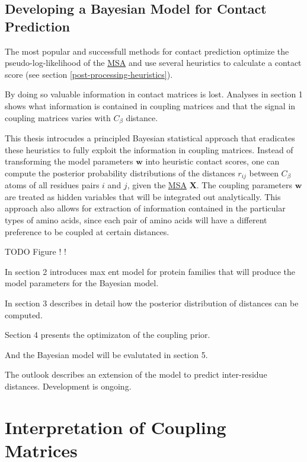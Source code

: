 \documentclass[12pt,a4paper,twoside]{book}
\newcommand{\Cb}{C_\beta}
\newcommand{\w}{\mathbf{w}}
\newcommand{\X}{\mathbf{X}}
\theoremstyle{definition}
\theoremstyle{definition}
\theoremstyle{remark}
\begin{document}
\section{Developing a Bayesian Model for Contact
Prediction}\label{developing-a-bayesian-model-for-contact-prediction}

The most popular and successfull methods for contact prediction optimize
the pseudo-log-likelihood of the \protect\hyperlink{abbrev}{MSA} and use
several heuristics to calculate a contact score (see section
\ref{post-processing-heuristics}).

By doing so valuable information in contact matrices is lost. Analyses
in section 1 shows what information is contained in coupling matrices
and that the signal in coupling matrices varies with \(\Cb\) distance.

This thesis introcudes a principled Bayesian statistical approach that
eradicates these heuristics to fully exploit the information in coupling
matrices. Instead of transforming the model parameters \(\w\) into
heuristic contact scores, one can compute the posterior probability
distributions of the distances \(r_{ij}\) between \(\Cb\) atoms of all
residues pairs \(i\) and \(j\), given the
\protect\hyperlink{abbrev}{MSA} \(\X\). The coupling parameters \(\w\)
are treated as hidden variables that will be integrated out
analytically. This approach also allows for extraction of information
contained in the particular types of amino acids, since each pair of
amino acids will have a different preference to be coupled at certain
distances.

TODO Figure ! !

In section 2 introduces max ent model for protein families that will
produce the model parameters for the Bayesian model.

In section 3 describes in detail how the posterior distribution of
distances can be computed.

Section 4 presents the optimizaton of the coupling prior.

And the Bayesian model will be evalutated in section 5.

The outlook describes an extension of the model to predict inter-residue
distances. Development is ongoing.

\chapter{Interpretation of Coupling
Matrices}\label{interpreting-coupling-matrices}
\end{document}
